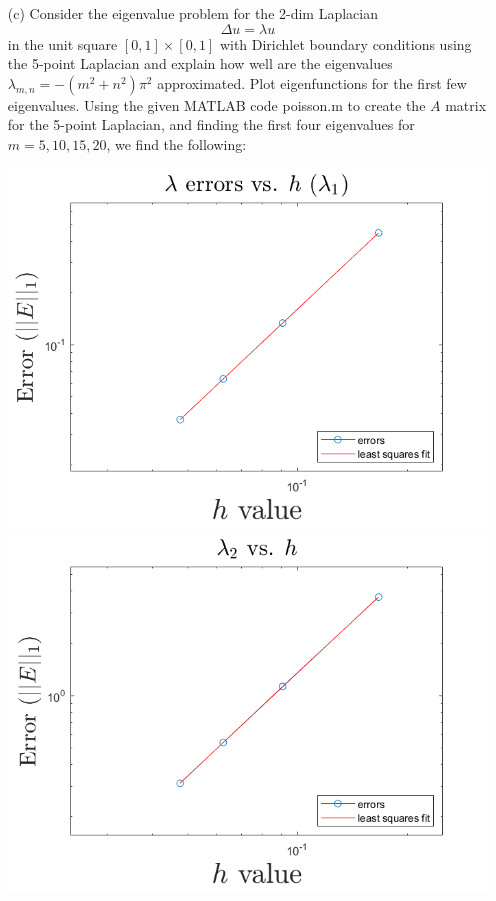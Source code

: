 \documentclass{article}
\begin{document}
\begin{enumerate}
    \item[(c)] Consider the eigenvalue problem for the 2-dim Laplacian
    \[\Delta u = \lambda u\]
    in the unit square $[0,1] \times [0,1]$ with Dirichlet boundary conditions using the 5-point Laplacian and explain how well are the eigenvalues $\lambda_{m,n} = -(m^2 + n^2)\pi^2$ approximated. Plot eigenfunctions for the first few eigenvalues.
    \newline\newline
    Using the given MATLAB code poisson.m to create the $A$ matrix for the 5-point Laplacian, and finding the first four eigenvalues for $m=5,10,15,20$, we find the following:
    \begin{center}
        \includegraphics[scale = 0.4]{laplaceLam1.png}
        \includegraphics[scale = 0.4]{laplaceLam2.png}

\end{center}
\end{enumerate}
\end{document}
